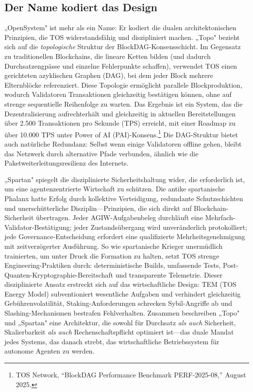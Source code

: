 \documentclass[11pt]{article}
\begin{document}
\subsection{Der Name kodiert das Design}
„OpenSystem" ist mehr als ein Name: Er kodiert die dualen architektonischen Prinzipien, die TOS widerstandsfähig und diszipliniert machen. „Topo" bezieht sich auf die \emph{topologische} Struktur der BlockDAG-Konsensschicht. Im Gegensatz zu traditionellen Blockchains, die lineare Ketten bilden (und dadurch Durchsatzengpässe und einzelne Fehlerpunkte schaffen), verwendet TOS einen gerichteten azyklischen Graphen (DAG), bei dem jeder Block mehrere Elternblöcke referenziert. Diese Topologie ermöglicht parallele Blockproduktion, wodurch Validatoren Transaktionen gleichzeitig bestätigen können, ohne auf strenge sequentielle Reihenfolge zu warten. Das Ergebnis ist ein System, das die Dezentralisierung aufrechterhält und gleichzeitig in aktuellen Bereitstellungen über 2.500 Transaktionen pro Sekunde (TPS) erreicht, mit einer Roadmap zu über 10.000 TPS unter Power of AI (PAI)-Konsens.\footnote{TOS Network, ``BlockDAG Performance Benchmark PERF-2025-08,'' August 2025.} Die DAG-Struktur bietet auch natürliche Redundanz: Selbst wenn einige Validatoren offline gehen, bleibt das Netzwerk durch alternative Pfade verbunden, ähnlich wie die Paketweiterleitungsresilienz des Internets.

„Spartan" spiegelt die disziplinierte Sicherheitshaltung wider, die erforderlich ist, um eine agentenzentrierte Wirtschaft zu schützen. Die antike spartanische Phalanx hatte Erfolg durch kollektive Verteidigung, redundante Schutzschichten und unerschütterliche Disziplin---Prinzipien, die sich direkt auf Blockchain-Sicherheit übertragen. Jeder AGIW-Aufgabenbeleg durchläuft eine Mehrfach-Validator-Bestätigung; jeder Zustandsübergang wird unveränderlich protokolliert; jede Governance-Entscheidung erfordert eine qualifizierte Mehrheitsgenehmigung mit zeitverzögerter Ausführung. So wie spartanische Krieger unermüdlich trainierten, um unter Druck die Formation zu halten, setzt TOS strenge Engineering-Praktiken durch: deterministische Builds, umfassende Tests, Post-Quanten-Kryptographie-Bereitschaft und transparente Telemetrie. Dieser disziplinierte Ansatz erstreckt sich auf das wirtschaftliche Design: TEM (TOS Energy Model) subventioniert wesentliche Aufgaben und verhindert gleichzeitig Gebührenvolatilität, Staking-Anforderungen schrecken Sybil-Angriffe ab und Slashing-Mechanismen bestrafen Fehlverhalten. Zusammen beschreiben „Topo" und „Spartan" eine Architektur, die sowohl für Durchsatz \emph{als auch} Sicherheit, Skalierbarkeit \emph{als auch} Rechenschaftspflicht optimiert ist---das duale Mandat jedes Systems, das danach strebt, das wirtschaftliche Betriebssystem für autonome Agenten zu werden.
\end{document}
